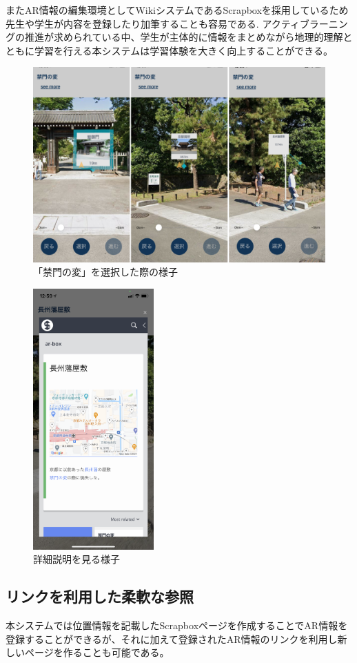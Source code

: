 またAR情報の編集環境としてWikiシステムであるScrapboxを採用しているため先生や学生が内容を登録したり加筆することも容易である.
アクティブラーニングの推進が求められている中、学生が主体的に情報をまとめながら地理的理解とともに学習を行える本システムは学習体験を大きく向上することができる。


\begin{figure}[H]
  \centering
  \includegraphics[width=120mm]{images/ar_kinmon.png}
  \caption{「禁門の変」を選択した際の様子} \label{fig:ar_kinmon}
\end{figure}

\begin{figure}[H]
  \centering
  \includegraphics[height=100mm]{images/ar_yashiki.png}
  \caption{詳細説明を見る様子} \label{fig:ar_yashiki}
\end{figure}

\subsection{リンクを利用した柔軟な参照}
\label{link_enum_notation}
本システムでは位置情報を記載したScrapboxページを作成することでAR情報を登録することができるが、それに加えて登録されたAR情報のリンクを利用し新しいページを作ることも可能である。

